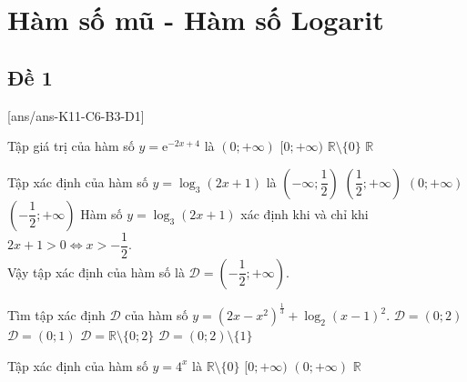 \section{Hàm số mũ - Hàm số Logarit}

\subsection{Đề 1}

[ans/ans-K11-C6-B3-D1]
\caulc

\begin{ex}%
	Tập giá trị của hàm số $y=\mathrm{e}^{-2x+4}$ là
	\choice
	{\True$(0;+\infty)$}
	{$[0;+\infty)$}
	{$\mathbb{R}\setminus\{0\}$}
	{$\mathbb{R}$}
\end{ex}

\begin{ex}%
	Tập xác định của hàm số $y=\log_3 \left(2x+1\right)$ là
	\choice
	{$\left(-\infty;\dfrac{1}{2}\right)$}
	{ $\left(\dfrac{1}{2};+\infty\right)$}
	{$\left(0;+\infty\right)$}
	{\True $\left(-\dfrac{1}{2};+\infty\right)$}
	\loigiai
	{
		Hàm số $y=\log_3 \left(2x+1\right)$ xác định khi và chỉ khi $2x+1>0 \Leftrightarrow  x>-\dfrac{1}{2}$.\\
		Vậy tập xác định của hàm số là $\mathscr{D} = \left(-\dfrac{1}{2};+\infty\right)$.
	}
\end{ex}

\begin{ex}%
	Tìm tập xác định $\mathscr{D}$ của hàm số $y=(2x-x^2)^{\frac{1}{3}}+\log_2(x-1)^2$.
	\choice
	{$\mathscr{D}=(0;2)$}
	{$\mathscr{D}=(0;1)$}
	{$\mathscr{D}=\mathbb{R}\setminus \{0;2\}$}
	{\True $\mathscr{D}=(0;2)\setminus \{1\}$}
\end{ex}

\begin{ex}%
	Tập xác định của hàm số $y=4^x$ là
	\choice
	{$\mathbb{R}\setminus\{0\}$}
	{$[0;+\infty)$}
	{$(0;+\infty)$}
	{\True $\mathbb{R}$}
\end{ex}


